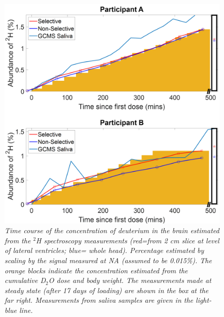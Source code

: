 \begin{figure}[H]
    \centering
    \includegraphics[width=1\textwidth]{Figures/D2O/Bulk_Graph.png}
    \caption{\textit{Time course of the concentration of deuterium in the brain estimated from the $^2$H spectroscopy measurements (red=from 2 cm slice at level of lateral ventricles; blue= whole head). Percentage estimated by scaling by the signal measured at \ac{NA} (assumed to be 0.015\%). The orange blocks indicate the concentration estimated from the cumulative D$_2$O dose and body weight. The measurements made at steady state (after 17 days of loading) are shown in the box at the far right. Measurements from saliva samples are given in the light-blue line.}}
    \label{fig:D2O:Bulk}
\end{figure}

